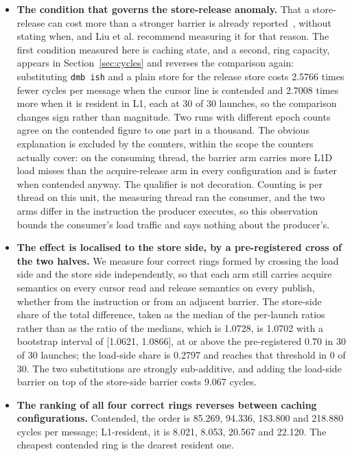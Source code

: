 \documentclass[conference]{IEEEtran}
\begin{document}
\begin{itemize}
\item \textbf{The condition that governs the store-release anomaly.} That a
store-release can cost more than a stronger barrier is already
reported~\cite{liu2020barriers,arden2023riscv}, without stating when, and
Liu et al. recommend measuring it for that reason. The first condition measured
here is caching state, and a second, ring capacity, appears in
Section~\ref{sec:cycles} and reverses the comparison again: substituting \texttt{dmb ish} and a plain store for the release
store costs 2.5766 times fewer cycles per message when the cursor line is
contended and 2.7008 times more when it is resident in L1, each at 30 of 30
launches, so the comparison changes sign rather than magnitude. Two runs with
different epoch counts agree on the contended figure to one part in a thousand.
The obvious explanation is excluded by the counters, within the scope the
counters actually cover: on the consuming thread, the barrier arm carries more
L1D load misses than the acquire-release arm in every configuration and is
faster when contended anyway. The qualifier is not decoration. Counting is per
thread on this unit, the measuring thread ran the consumer, and the two arms
differ in the instruction the producer executes, so this observation bounds the
consumer's load traffic and says nothing about the producer's.

\item \textbf{The effect is localised to the store side, by a pre-registered
cross of the two halves.} We measure four correct rings formed by crossing the
load side and the store side independently, so that each arm still carries
acquire semantics on every cursor read and release semantics on every publish,
whether from the instruction or from an adjacent barrier. The store-side share
of the total difference, taken as the median of the per-launch ratios rather
than as the ratio of the medians, which is 1.0728, is 1.0702 with a bootstrap
interval of [1.0621, 1.0866], at or above the pre-registered 0.70 in 30 of 30 launches; the
load-side share is 0.2797 and reaches that threshold in 0 of 30. The two
substitutions are strongly sub-additive, and adding the load-side barrier on
top of the store-side barrier costs 9.067 cycles.

\item \textbf{The ranking of all four correct rings reverses between caching
configurations.} Contended, the order is 85.269, 94.336, 183.800 and 218.880
cycles per message; L1-resident, it is 8.021, 8.053, 20.567 and 22.120. The
cheapest contended ring is the dearest resident one.


\end{itemize}
\end{document}
